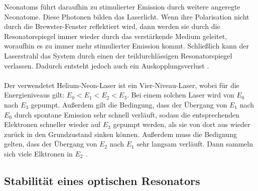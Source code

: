 Neonatoms führt daraufhin zu stimulierter Emission durch weitere angeregte Neonatome. 
Diese Photonen bilden das Laserlicht. Wenn ihre Polarisation nicht durch die 
Brewster-Fenster reflektiert wird, dann werden sie durch die Resonatorspiegel 
immer wieder durch das verstärkende Medium geleitet, woraufhin es zu immer mehr
stimulierter Emission kommt. Schließlich kann der Laserstrahl das System durch einen 
der teildurchlässigen Resonatorspiegel verlassen. Dadurch entsteht jedoch auch ein 
Auskopplungsverlust \cite{2}.\\\\
Der verwendetet Helium-Neon-Laser ist ein Vier-Niveau-Laser, wobei für die 
Energieniveaus gilt: $E_{\text{0}} <E_{\text{1}} < E_{\text{2}} < E_{\text{3}}$.
Bei einem solchen Laser wird von $E_{\text{0}}$ nach $E_{\text{3}}$ gepumpt. 
Außerdem gilt die Bedingung, dass der Übergang von $E_{\text{1}}$ nach $E_{\text{0}}$
durch spontane Emission sehr schnell verläuft, sodass die entsprechenden 
Elektronen schneller wieder auf $E_{\text{3}}$ gepumpt werden, als sie von dort 
aus wieder zurück in den Grundzustand sinken können. Außerdem muss die 
Bedignung gelten, dass der Übergang von $E_{\text{2}}$ nach $E_{\text{1}}$
sehr langsam verläuft. Dann sammeln sich viele Elktronen in $E_{\text{2}}$ \cite{3}.

\subsection{Stabilität eines optischen Resonators}

